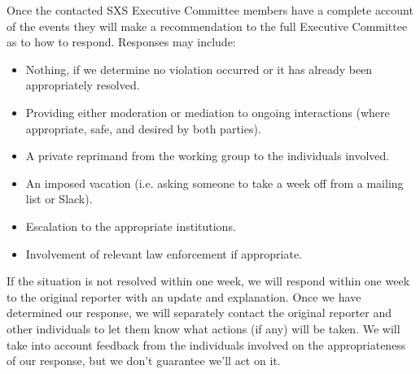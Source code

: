 Once the contacted SXS Executive Committee members
have a complete account of the events they will make a recommendation to the
full Executive Committee as to how to respond. Responses may include: 
\begin{itemize}
\item Nothing, if we determine no violation occurred or it has already
  been appropriately resolved.
\item Providing either moderation or mediation to ongoing interactions
  (where appropriate, safe, and desired by both parties).
\item A private reprimand from the working group to the individuals
  involved.
\item An imposed vacation (i.e.  asking someone to take a week off
  from a mailing list or Slack).
\item Escalation to the appropriate institutions.
\item Involvement of relevant law enforcement if appropriate.
\end{itemize}
If the situation is not resolved within one week, we will respond
within one week to the original reporter with an update and
explanation. Once we have determined our response, we will separately
contact the original reporter and other individuals to let them know
what actions (if any) will be taken. We will take into account
feedback from the individuals involved on the appropriateness of our
response, but we don’t guarantee we’ll act on it.


